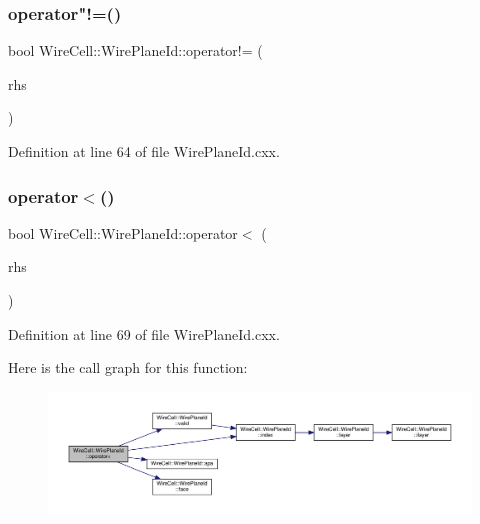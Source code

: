\subsubsection{\texorpdfstring{operator"!=()}{operator!=()}}
{\footnotesize\ttfamily bool Wire\+Cell\+::\+Wire\+Plane\+Id\+::operator!= (\begin{DoxyParamCaption}\item[{const \hyperlink{class_wire_cell_1_1_wire_plane_id}{Wire\+Plane\+Id} \&}]{rhs }\end{DoxyParamCaption})}



Definition at line 64 of file Wire\+Plane\+Id.\+cxx.

\mbox{\label{class_wire_cell_1_1_wire_plane_id_addc8729f389598caf82777cf5cddb30a}} 
\subsubsection{\texorpdfstring{operator$<$()}{operator<()}}
{\footnotesize\ttfamily bool Wire\+Cell\+::\+Wire\+Plane\+Id\+::operator$<$ (\begin{DoxyParamCaption}\item[{const \hyperlink{class_wire_cell_1_1_wire_plane_id}{Wire\+Plane\+Id} \&}]{rhs }\end{DoxyParamCaption})}



Definition at line 69 of file Wire\+Plane\+Id.\+cxx.

Here is the call graph for this function\+:
\nopagebreak
\begin{figure}[H]
\begin{center}
\leavevmode
\includegraphics[width=350pt]{class_wire_cell_1_1_wire_plane_id_addc8729f389598caf82777cf5cddb30a_cgraph}
\end{center}
\end{figure}
\mbox{\label{class_wire_cell_1_1_wire_plane_id_a90632df3b572a85909d3ab17eb9bb4d4}} 
